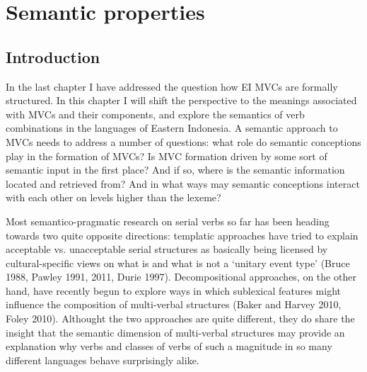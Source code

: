 \chapter{Semantic properties} \label{ch:sem}
\section{Introduction}
In the last chapter I have addressed the question how EI MVCs are formally structured. In this chapter I will shift the perspective to the meanings associated with MVCs and their components, and explore the semantics of verb combinations in the languages of Eastern Indonesia. A semantic approach to MVCs needs to address a number of questions: what role do semantic conceptions play in the formation of MVCs? Is MVC formation driven by some sort of semantic input in the first place? And if so, where is the semantic information located and retrieved from? And in what ways may semantic conceptions interact with each other on levels higher than the lexeme? 

Most semantico-pragmatic research on serial verbs so far has been heading towards two quite opposite directions: templatic approaches have tried to explain acceptable vs. unacceptable serial structures as basically being licensed by cultural-specific views on what is and what is not a `unitary event type' (Bruce 1988, Pawley 1991, 2011, Durie 1997). Decompositional approaches, on the other hand, have recently begun to explore ways in which sublexical features might influence the composition of multi-verbal structures (Baker and Harvey 2010, Foley 2010). Althought the two approaches are quite different, they do share the insight that the semantic dimension of multi-verbal structures may provide an explanation why verbs and classes of verbs of such a magnitude in so many different languages behave surprisingly alike.

